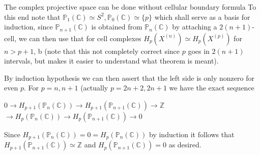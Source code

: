 The complex projective space can be done without cellular boundary formula 
To this end note that \( \mathbb{P}_1(\mathbb{C}) \simeq S^2, \mathbb{P}_0(\mathbb{C}) \simeq \{p\} \) which shall serve as a basis for induction,
since \( \mathbb{P}_{n+1}(\mathbb{C}) \) is obtained from \( \mathbb{P}_{n}(\mathbb{C}) \) by attaching a \( 2(n+1) \)-cell, we can then use that
for cell complexes \( H_p(X^{(n)}) \simeq H_p(X^{(p)}) \) for \( n > p + 1\), b
(note that this not completely correct since \( p \) goes in \( 2(n+1) \) intervals, but makes it easier to understand what theorem is meant).

By induction hypothesis we can then assert that the left side is only nonzero for even \( p \). For \( p = n, n+1 \) (actually \( p = 2n + 2, 2n + 1 \)
we have the exact sequence

\( 0 \longrightarrow H_{p+1}(\mathbb{P}_n(\mathbb{C})) \longrightarrow H_{p+1}(\mathbb{P}_{n+1}(\mathbb{C})) \longrightarrow \mathbb{Z}\)
\( \longrightarrow H_{p}(\mathbb{P}_n(\mathbb{C})) \longrightarrow H_{p}(\mathbb{P}_{n+1}(\mathbb{C})) \longrightarrow 0\)

Since \(H_{p+1}(\mathbb{P}_n(\mathbb{C})) = 0 = H_{p}(\mathbb{P}_n(\mathbb{C})) \) by induction it follows that
\( H_{p+1}(\mathbb{P}_{n+1}(\mathbb{C})) \simeq \mathbb{Z} \) and \( H_{p}(\mathbb{P}_{n+1}(\mathbb{C})) = 0 \) as desired.



